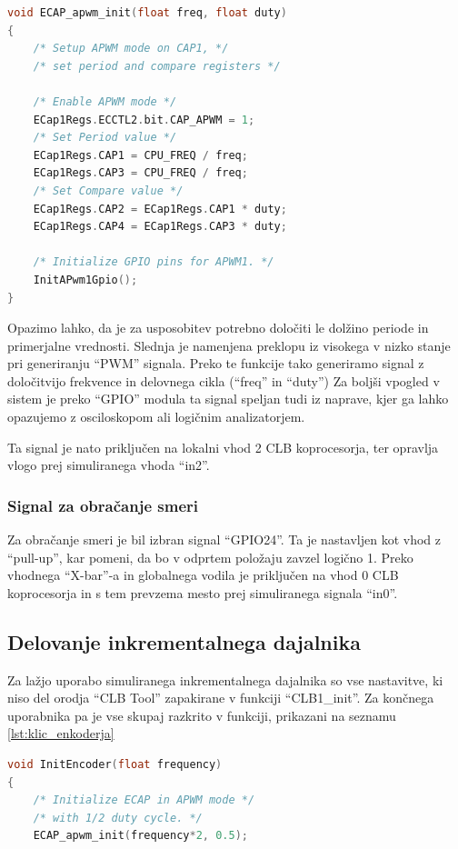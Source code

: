 \documentclass[a4paper]{article}
\begin{document}
\begin{sloppypar}
\begin{lstlisting}[language=C,
                   caption={Implementacija funkcije za usposobitev ``eCAP'' 
                            modula v ``apwm'' načinu},
                   label={lst:ecap_init}]
void ECAP_apwm_init(float freq, float duty)
{
    /* Setup APWM mode on CAP1, */
    /* set period and compare registers */

    /* Enable APWM mode */
    ECap1Regs.ECCTL2.bit.CAP_APWM = 1;
    /* Set Period value */
    ECap1Regs.CAP1 = CPU_FREQ / freq;
    ECap1Regs.CAP3 = CPU_FREQ / freq;
    /* Set Compare value */
    ECap1Regs.CAP2 = ECap1Regs.CAP1 * duty;
    ECap1Regs.CAP4 = ECap1Regs.CAP3 * duty;

    /* Initialize GPIO pins for APWM1. */
    InitAPwm1Gpio();
}
\end{lstlisting}

Opazimo lahko, da je za usposobitev potrebno določiti le dolžino periode in
primerjalne vrednosti. Slednja je namenjena preklopu iz visokega v nizko stanje
pri generiranju ``PWM'' signala. Preko te funkcije tako generiramo signal z
določitvijo frekvence in delovnega cikla (``freq'' in ``duty'') Za boljši
vpogled v sistem je preko ``GPIO'' modula ta signal speljan tudi iz naprave,
kjer ga lahko opazujemo z osciloskopom ali logičnim analizatorjem.

Ta signal je nato priključen na lokalni vhod 2 CLB koprocesorja, ter opravlja
vlogo prej simuliranega vhoda ``in2''.

\subsubsection{Signal za obračanje smeri}
Za obračanje smeri je bil izbran signal ``GPIO24''. Ta je nastavljen kot vhod z
``pull-up'', kar pomeni, da bo v odprtem položaju zavzel logično 1. Preko
vhodnega ``X-bar''-a in globalnega vodila je priključen na vhod 0 CLB
koprocesorja in s tem prevzema mesto prej simuliranega signala ``in0''.

\subsection{Delovanje inkrementalnega dajalnika}
Za lažjo uporabo simuliranega inkrementalnega dajalnika so vse nastavitve, ki
niso del orodja ``CLB Tool'' zapakirane v funkciji ``CLB1\_init''. Za končnega
uporabnika pa je vse skupaj razkrito v funkciji, prikazani na seznamu
\ref{lst:klic_enkoderja}

\begin{lstlisting}[language=C,
                   caption={Implementacija funkcije za nastavitev 
                            inkrementalnega dajalnika},
                   label={lst:klic_enkoderja}]
void InitEncoder(float frequency)
{
    /* Initialize ECAP in APWM mode */
    /* with 1/2 duty cycle. */
    ECAP_apwm_init(frequency*2, 0.5);


\end{lstlisting}
\end{sloppypar}
\end{document}
